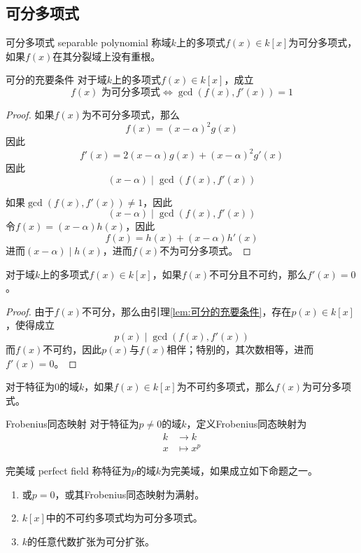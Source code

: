 \subsection{可分多项式}

\begin{definition}{可分多项式 separable polynomial}
	称域$k$上的多项式$f(x)\in k[x]$为可分多项式，如果$f(x)$在其分裂域上没有重根。
\end{definition}

\begin{lemma}{}{可分的充要条件}
	对于域$k$上的多项式$f(x)\in k[x]$，成立%
	$$
	f(x)\text{ 为可分多项式}
	\iff
	\gcd(f(x),f'(x))=1
	$$
\end{lemma}

\begin{proof}
	如果$f(x)$为不可分多项式，那么%
	$$
	f(x)=(x-\alpha)^2g(x)
	$$
	因此%
	$$
	f'(x)=2(x-\alpha)g(x)+(x-\alpha)^2g'(x)
	$$
	因此%
	$$
	(x-\alpha)\mid \gcd(f(x),f'(x))
	$$
	
	如果$\gcd(f(x),f'(x))\ne 1$，因此
	$$
	(x-\alpha)\mid \gcd(f(x),f'(x))
	$$
	令$f(x)=(x-\alpha)h(x)$，因此%
	$$
	f(x)=h(x)+(x-\alpha)h'(x)
	$$
	进而$(x-\alpha)\mid h(x)$，进而$f(x)$不为可分多项式。
\end{proof}

\begin{lemma}
	对于域$k$上的多项式$f(x)\in k[x]$，如果$f(x)$不可分且不可约，那么$f'(x)=0$。
\end{lemma}

\begin{proof}
	由于$f(x)$不可分，那么由引理\ref{lem:可分的充要条件}，存在$p(x)\in k[x]$，使得成立
	$$
	p(x)\mid \gcd(f(x),f'(x))
	$$
	而$f(x)$不可约，因此$p(x)$与$f(x)$相伴；特别的，其次数相等，进而$f'(x)=0$。
\end{proof}

\begin{corollary}
	对于特征为$0$的域$k$，如果$f(x)\in k[x]$为不可约多项式，那么$f(x)$为可分多项式。
\end{corollary}

\begin{definition}{Frobenius同态映射}
	对于特征为$p\ne 0$的域$k$，定义Frobenius同态映射为
	\begin{align*}
		k &\longrightarrow k\\
		x &\longmapsto x^p
	\end{align*}
\end{definition}

\begin{definition}{完美域 perfect field}
	称特征为$p$的域$k$为完美域，如果成立如下命题之一。
	\begin{enumerate}
		\item 或$p=0$，或其Frobenius同态映射为满射。
		\item $k[x]$中的不可约多项式均为可分多项式。
		\item $k$的任意代数扩张为可分扩张。
	\end{enumerate}
\end{definition}

